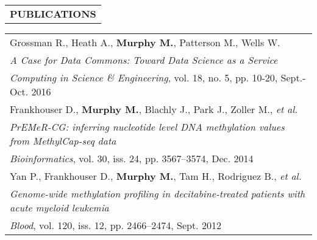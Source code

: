 \begin{tabularx}{\textwidth}{ L }
  \textbf{PUBLICATIONS} \\
\end{tabularx}

\begin{tabularx}{\textwidth}{ X }
    Grossman R., Heath A., \textbf{Murphy M.}, Patterson M., Wells W. \\
    \footnotesize\textit{A Case for Data Commons: Toward Data Science as a Service} \\
    \footnotesize{\textit{Computing in Science \& Engineering}, vol. 18, no. 5, pp. 10-20, Sept.-Oct. 2016} \\

    \vspace{1pt}

    Frankhouser D., \textbf{Murphy M.}, Blachly J., Park J., Zoller M., \textit{et al.} \\
    \footnotesize\textit{PrEMeR-CG: inferring nucleotide level DNA methylation values from MethylCap-seq data} \\
    \footnotesize{\textit{Bioinformatics}, vol. 30, iss. 24, pp. 3567--3574, Dec. 2014} \\

    \vspace{1pt}

    Yan P., Frankhouser D., \textbf{Murphy M.}, Tam H., Rodriguez B., \textit{et al.} \\
    \footnotesize\textit{Genome-wide methylation profiling in decitabine-treated patients with acute myeloid leukemia} \\
    \footnotesize{\textit{Blood}, vol. 120, iss. 12, pp. 2466--2474, Sept. 2012} \\

%
%
%
\end{tabularx}

